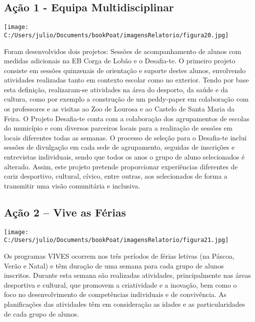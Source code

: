 \documentclass[
]{book}
\begin{document}
\hypertarget{auxe7uxe3o-1---equipa-multidisciplinar}{%
\subsection{\texorpdfstring{\textbf{Ação 1 - Equipa Multidisciplinar}}{Ação 1 - Equipa Multidisciplinar}}\label{auxe7uxe3o-1---equipa-multidisciplinar}}

\texttt{[image: C:/Users/julio/Documents/bookPoat/imagensRelatorio/figura20.jpg]}

Foram desenvolvidos dois projetos: Sessões de acompanhamento de alunos com medidas adicionais na EB Corga de Lobão e o Desafia-te. O primeiro projeto consiste em sessões quinzenais de orientação e suporte destes alunos, envolvendo atividades realizadas tanto em contexto escolar como no exterior. Tendo por base esta definição, realizaram-se atividades na área do desporto, da saúde e da cultura, como por exemplo a construção de um peddy-paper em colaboração com os professores e as visitas ao Zoo de Lourosa e ao Castelo de Santa Maria da Feira.
O Projeto Desafia-te conta com a colaboração dos agrupamentos de escolas do município e com diversos parceiros locais para a realização de sessões em locais diferentes todas as semanas. O processo de seleção para o Desafia-te inclui sessões de divulgação em cada sede de agrupamento, seguidas de inscrições e entrevistas individuais, sendo que todos os anos o grupo de aluno selecionados é alterado. Assim, este projeto pretende proporcionar experiências diferentes de cariz desportivo, cultural, cívico, entre outras, aos selecionados de forma a transmitir uma visão comunitária e inclusiva.

\hypertarget{auxe7uxe3o-2-vive-as-fuxe9rias}{%
\subsection{\texorpdfstring{\textbf{Ação 2 -- Vive as Férias}}{Ação 2 -- Vive as Férias}}\label{auxe7uxe3o-2-vive-as-fuxe9rias}}

\texttt{[image: C:/Users/julio/Documents/bookPoat/imagensRelatorio/figura21.jpg]}

Os programas VIVES ocorrem nos três períodos de férias letivas (na Páscoa, Verão e Natal) e têm duração de uma semana para cada grupo de alunos inscritos. Durante esta semana são realizadas atividades, principalmente nas áreas desportiva e cultural, que promovem a criatividade e a inovação, bem como o foco no desenvolvimento de competências individuais e de convivência. As planificações das atividades têm em consideração as idades e as particularidades de cada grupo de alunos.
\end{document}
